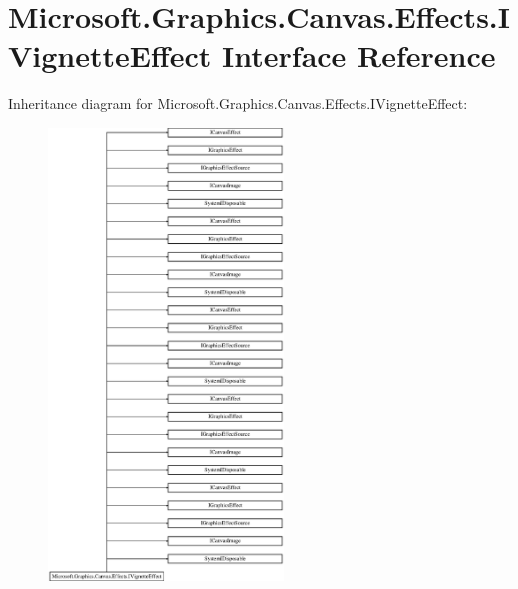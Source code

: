 \hypertarget{interface_microsoft_1_1_graphics_1_1_canvas_1_1_effects_1_1_i_vignette_effect}{}\section{Microsoft.\+Graphics.\+Canvas.\+Effects.\+I\+Vignette\+Effect Interface Reference}
\label{interface_microsoft_1_1_graphics_1_1_canvas_1_1_effects_1_1_i_vignette_effect}
Inheritance diagram for Microsoft.\+Graphics.\+Canvas.\+Effects.\+I\+Vignette\+Effect\+:\begin{figure}[H]
\begin{center}
\leavevmode
\includegraphics[height=12.000000cm]{interface_microsoft_1_1_graphics_1_1_canvas_1_1_effects_1_1_i_vignette_effect}
\end{center}
\end{figure}
